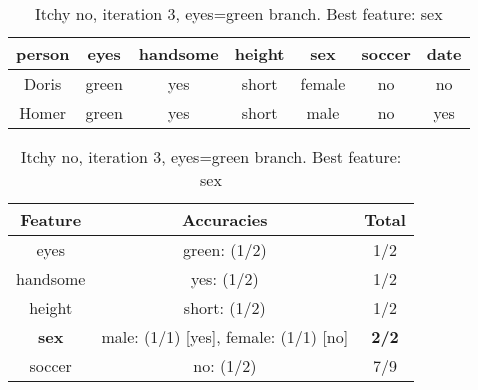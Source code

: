 \begin{table}[h!]
  \centering
  \begin{tabular}{cccccc|c}
    \toprule
    person      & eyes  & handsome & height & sex    & soccer & date\\
    \midrule
    Doris       & green & yes      & short  & female & no     & no  \\
    Homer       & green & yes      & short  & male   & no     & yes \\
    \bottomrule
  \end{tabular}

  \vspace{.5cm}

  \begin{tabular}{ccc}
    \toprule
    Feature      & Accuracies                              & Total\\
    \midrule
    eyes         & green: (1/2)                            & 1/2\\
    handsome     & yes: (1/2)                              & 1/2\\
    height       & short: (1/2)                            & 1/2\\
    \textbf{sex} & male: (1/1) [yes], female: (1/1) [no]   & \textbf{2/2}\\
    soccer       & no: (1/2)                               & 7/9\\
    \bottomrule
  \end{tabular}
  \caption*{Itchy no, iteration 3, eyes=green branch. Best feature: sex}
\end{table}
